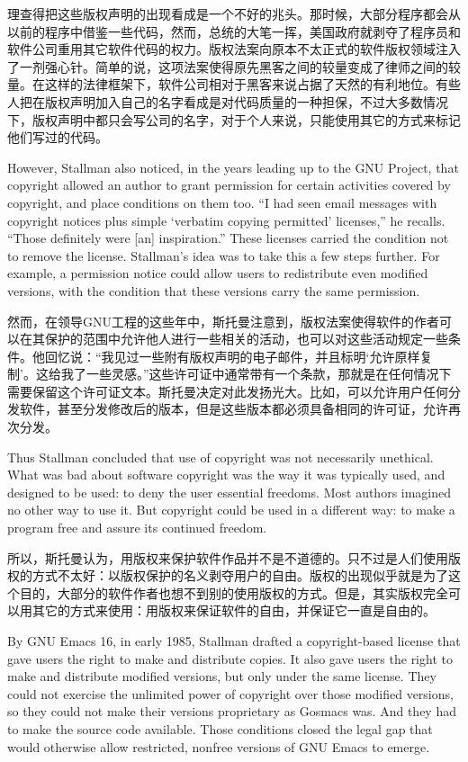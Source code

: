 \ifdefined\chs
理查得把这些版权声明的出现看成是一个不好的兆头。那时候，大部分程序都会从以前的程序中借鉴一些代码，然而，总统的大笔一挥，美国政府就剥夺了程序员和软件公司重用其它软件代码的权力。版权法案向原本不太正式的软件版权领域注入了一剂强心针。简单的说，这项法案使得原先黑客之间的较量变成了律师之间的较量。在这样的法律框架下，软件公司相对于黑客来说占据了天然的有利地位。有些人把在版权声明加入自己的名字看成是对代码质量的一种担保，不过大多数情况下，版权声明中都只会写公司的名字，对于个人来说，只能使用其它的方式来标记他们写过的代码。
\fi

\ifdefined\eng
However, Stallman also noticed, in the years leading up to the GNU Project, that copyright allowed an author to grant permission for certain activities covered by copyright, and place conditions on them too.  ``I had seen email messages with copyright notices plus simple `verbatim copying permitted' licenses,'' he recalls. ``Those definitely were [an] inspiration.''  These licenses carried the condition not to remove the license.  Stallman's idea was to take this a few steps further.  For example, a permission notice could allow users to redistribute even modified versions, with the condition that these versions carry the same permission.
\fi

\ifdefined\chs
然而，在领导GNU工程的这些年中，斯托曼注意到，版权法案使得软件的作者可以在其保护的范围中允许他人进行一些相关的活动，也可以对这些活动规定一些条件。他回忆说：“我见过一些附有版权声明的电子邮件，并且标明‘允许原样复制’。这给我了一些灵感。”这些许可证中通常带有一个条款，那就是在任何情况下需要保留这个许可证文本。斯托曼决定对此发扬光大。比如，可以允许用户任何分发软件，甚至分发修改后的版本，但是这些版本都必须具备相同的许可证，允许再次分发。
\fi

\ifdefined\eng
Thus Stallman concluded that use of copyright was not necessarily unethical.  What was bad about software copyright was the way it was typically used, and designed to be used: to deny the user essential freedoms.  Most authors imagined no other way to use it.  But copyright could be used in a different way: to make a program free and assure its continued freedom.
\fi

\ifdefined\chs
所以，斯托曼认为，用版权来保护软件作品并不是不道德的。只不过是人们使用版权的方式不太好：以版权保护的名义剥夺用户的自由。版权的出现似乎就是为了这个目的，大部分的软件作者也想不到别的使用版权的方式。但是，其实版权完全可以用其它的方式来使用：用版权来保证软件的自由，并保证它一直是自由的。
\fi

\ifdefined\eng
By GNU Emacs 16, in early 1985, Stallman drafted a copyright-based license that gave users the right to make and distribute copies. It also gave users the right to make and distribute modified versions, but only under the same license.  They could not exercise the unlimited power of copyright over those modified versions, so they could not make their versions proprietary as Gosmacs was.  And they had to make the source code available.  Those conditions closed the legal gap that would otherwise allow restricted, nonfree versions of GNU Emacs to emerge.
\fi

